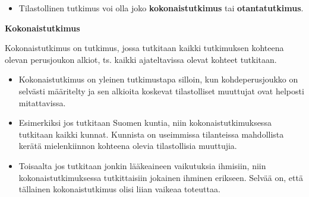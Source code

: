 \documentclass[
]{book}
\providecommand{\tightlist}{%
  \setlength{\itemsep}{0pt}\setlength{\parskip}{0pt}}
\begin{document}
\begin{itemize}
\tightlist
\item
  Tilastollinen tutkimus voi olla joko \textbf{kokonaistutkimus} tai \textbf{otantatutkimus}.
\end{itemize}

\begin{defblock}{}

\textbf{Kokonaistutkimus}

Kokonaistutkimus on tutkimus, jossa tutkitaan kaikki tutkimuksen kohteena olevan perusjoukon alkiot, ts. kaikki ajateltavissa olevat kohteet tutkitaan.

\begin{itemize}
\tightlist
\item
  Kokonaistutkimus on yleinen tutkimustapa silloin, kun kohdeperusjoukko on selvästi määritelty ja sen alkioita koskevat tilastolliset muuttujat ovat helposti mitattavissa.
\item
  Esimerkiksi jos tutkitaan Suomen kuntia, niin kokonaistutkimuksessa tutkitaan kaikki kunnat. Kunnista on useimmissa tilanteissa mahdollista kerätä mielenkiinnon kohteena olevia tilastollisia muuttujia.
\item
  Toisaalta jos tutkitaan jonkin lääkeaineen vaikutuksia ihmisiin, niin kokonaistutkimuksessa tutkittaisiin jokainen ihminen erikseen. Selvää on, että tällainen kokonaistutkimus olisi liian vaikeaa toteuttaa.
\end{itemize}

\end{defblock}
\end{document}
